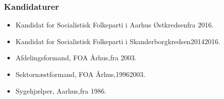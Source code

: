 \documentclass[11pt, a4paper]{awesome-cv}
\begin{document}
\begin{cvletter}
\subsubsection*{Kandidaturer}
\begin{itemize}
\item Kandidat for Socialistisk Folkeparti i Aarhus Østkredsenfra 2016.
\item Kandidat for Socialistisk Folkeparti i Skanderborgkredsen20142016.
\end{itemize}
\begin{itemize}
\item Afdelingsformand, FOA Århus,fra 2003.
\item Sektornæstformand, FOA Århus,19962003.
\item Sygehjælper, Aarhus,fra 1986.
\end{itemize}
\end{cvletter}
\end{document}
